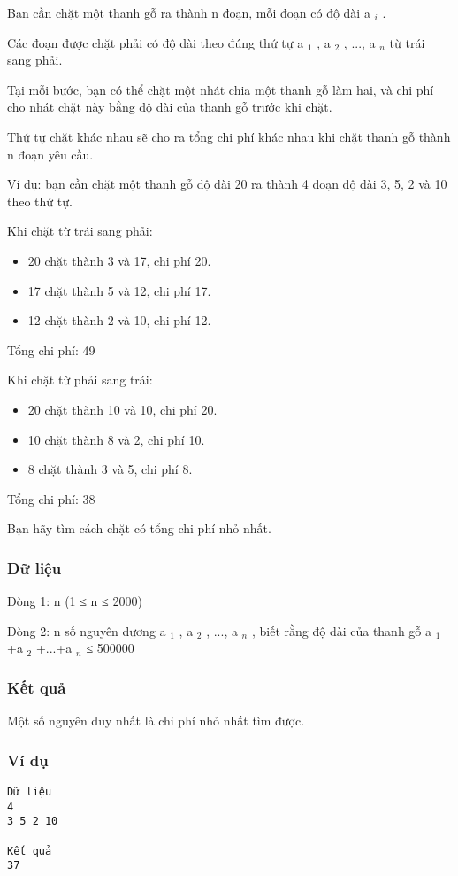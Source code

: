 

Bạn cần chặt một thanh gỗ ra thành n đoạn, mỗi đoạn có độ dài a $_ i $ .

Các đoạn được chặt phải có độ dài theo đúng thứ tự a $_ 1 $ , a $_ 2 $ , ..., a $_ n $ từ trái sang phải.

Tại mỗi bước, bạn có thể chặt một nhát chia một thanh gỗ làm hai, và chi phí cho nhát chặt này bằng độ dài của thanh gỗ trước khi chặt.

Thứ tự chặt khác nhau sẽ cho ra tổng chi phí khác nhau khi chặt thanh gỗ thành n đoạn yêu cầu.

Ví dụ: bạn cần chặt một thanh gỗ độ dài 20 ra thành 4 đoạn độ dài 3, 5, 2 và 10 theo thứ tự.

Khi chặt từ trái sang phải:
\begin{itemize}
	\item 20 chặt thành 3 và 17, chi phí 20.
	\item 17 chặt thành 5 và 12, chi phí 17.
	\item 12 chặt thành 2 và 10, chi phí 12.
\end{itemize}

Tổng chi phí: 49

Khi chặt từ phải sang trái:
\begin{itemize}
	\item 20 chặt thành 10 và 10, chi phí 20.
	\item 10 chặt thành 8 và 2, chi phí 10.
	\item 8 chặt thành 3 và 5, chi phí 8.
\end{itemize}

Tổng chi phí: 38

Bạn hãy tìm cách chặt có tổng chi phí nhỏ nhất.

\subsubsection{Dữ liệu}

Dòng 1: n (1 ≤ n ≤ 2000)

Dòng 2: n số nguyên dương a $_ 1 $ , a $_ 2 $ , ..., a $_ n $ , biết rằng độ dài của thanh gỗ a $_ 1 $ +a $_ 2 $ +...+a $_ n $ ≤ 500000

\subsubsection{Kết quả}

Một số nguyên duy nhất là chi phí nhỏ nhất tìm được.

\subsubsection{Ví dụ}
\begin{verbatim}
Dữ liệu
4
3 5 2 10

Kết quả
37
\end{verbatim}